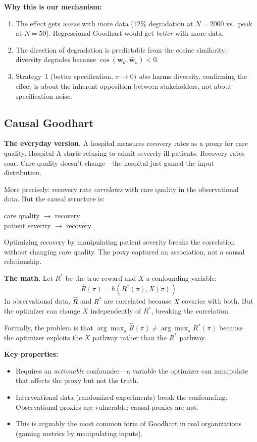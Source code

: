 \documentclass[11pt]{article}
\begin{document}
\textbf{Why this is our mechanism:}
\begin{enumerate}
  \item The effect gets \emph{worse} with more data (42\% degradation
    at $N=2000$ vs.\ peak at $N=50$). Regressional Goodhart would get
    \emph{better} with more data.
  \item The direction of degradation is predictable from the cosine
    similarity: diversity degrades because $\cos(\mathbf{w}_d,
    \hat{\mathbf{w}}_u) < 0$.
  \item Strategy~1 (better specification, $\sigma \to 0$) \emph{also}
    harms diversity, confirming the effect is about the inherent
    opposition between stakeholders, not about specification noise.
\end{enumerate}

\subsection{Causal Goodhart}

\textbf{The everyday version.} A hospital measures recovery rates as a
proxy for care quality. Hospital A starts refusing to admit severely ill
patients. Recovery rates soar. Care quality doesn't change---the
hospital just gamed the input distribution.

More precisely: recovery rate \emph{correlates} with care quality in the
observational data. But the causal structure is:
\begin{center}
  care quality $\to$ recovery \\
  patient severity $\to$ recovery
\end{center}
Optimizing recovery by manipulating patient severity breaks the
correlation without changing care quality. The proxy captured an
association, not a causal relationship.

\textbf{The math.} Let $R^*$ be the true reward and $X$ a confounding
variable:
\begin{equation}
  \hat{R}(\pi) = h(R^*(\pi), X(\pi))
\end{equation}
In observational data, $\hat{R}$ and $R^*$ are correlated because $X$
covaries with both. But the optimizer can change $X$ independently of
$R^*$, breaking the correlation.

Formally, the problem is that
$\arg\max_\pi \hat{R}(\pi) \neq \arg\max_\pi R^*(\pi)$
because the optimizer exploits the $X$ pathway rather than the $R^*$
pathway.

\textbf{Key properties:}
\begin{itemize}
  \item Requires an \emph{actionable} confounder---a variable the
    optimizer can manipulate that affects the proxy but not the truth.
  \item Interventional data (randomized experiments) break the
    confounding. Observational proxies are vulnerable; causal proxies
    are not.
  \item This is arguably the most common form of Goodhart in real
    organizations (gaming metrics by manipulating inputs).
\end{itemize}
\end{document}
